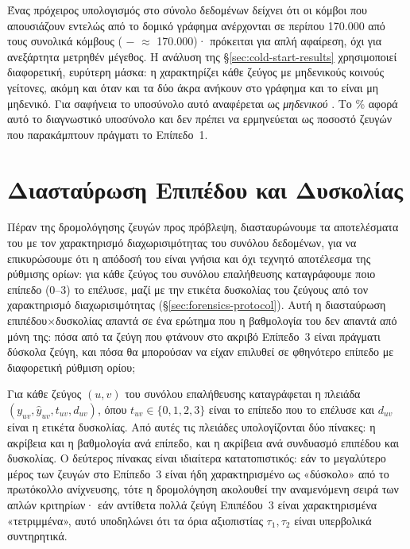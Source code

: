 Ένας πρόχειρος υπολογισμός στο σύνολο δεδομένων  δείχνει ότι οι κόμβοι
που απουσιάζουν εντελώς από το δομικό γράφημα ανέρχονται σε περίπου 170.000 από τους
συνολικά \GraphNodesTotal{} κόμβους (\GraphNodesTotal{} $-$ \GraphNodes{} $\approx$ 170.000)· πρόκειται για απλή
αφαίρεση, όχι για ανεξάρτητα μετρηθέν μέγεθος.
Η ανάλυση της \S\ref{sec:cold-start-results} χρησιμοποιεί διαφορετική, ευρύτερη
μάσκα: η \texttt{} χαρακτηρίζει κάθε ζεύγος με μηδενικούς
κοινούς γείτονες, ακόμη και όταν και τα δύο άκρα ανήκουν στο γράφημα και το
 είναι μη μηδενικό.
Για σαφήνεια το υποσύνολο αυτό
αναφέρεται ως \emph{μηδενικού }.
Το \ColdStartPct\% αφορά αυτό το
διαγνωστικό υποσύνολο και δεν πρέπει να ερμηνεύεται ως ποσοστό ζευγών που
παρακάμπτουν πράγματι το Επίπεδο~1.


\section{Διασταύρωση Επιπέδου και Δυσκολίας}
\label{sec:cascade-diagnostic}

Πέραν της δρομολόγησης ζευγών προς πρόβλεψη, διασταυρώνουμε τα αποτελέσματα του
 με τον χαρακτηρισμό διαχωρισιμότητας του συνόλου δεδομένων, για να
επικυρώσουμε ότι η απόδοσή του είναι γνήσια και όχι τεχνητό αποτέλεσμα της ρύθμισης ορίων: για κάθε
ζεύγος του συνόλου επαλήθευσης καταγράφουμε ποιο επίπεδο (0--3) το επέλυσε, μαζί
με την ετικέτα δυσκολίας του ζεύγους από τον χαρακτηρισμό διαχωρισιμότητας
(\S\ref{sec:forensics-protocol}). Αυτή η διασταύρωση επιπέδου$\times$δυσκολίας
απαντά σε ένα ερώτημα που η βαθμολογία  του  δεν
απαντά από μόνη της: πόσα από τα ζεύγη που φτάνουν στο ακριβό Επίπεδο~3 είναι
πράγματι δύσκολα ζεύγη, και πόσα θα μπορούσαν να είχαν επιλυθεί σε φθηνότερο
επίπεδο με διαφορετική ρύθμιση ορίου;

Για κάθε ζεύγος $(u,v)$ του συνόλου επαλήθευσης καταγράφεται η πλειάδα
$(y_{uv}, \hat{y}_{uv}, t_{uv}, d_{uv})$, όπου $t_{uv} \in \{0,1,2,3\}$ είναι το
επίπεδο που το επέλυσε και $d_{uv}$ είναι η ετικέτα δυσκολίας.
Από αυτές τις
πλειάδες υπολογίζονται δύο πίνακες: η ακρίβεια και η βαθμολογία  ανά
επίπεδο, και η ακρίβεια ανά συνδυασμό επιπέδου και δυσκολίας.
Ο δεύτερος πίνακας
είναι ιδιαίτερα κατατοπιστικός: εάν το μεγαλύτερο μέρος των ζευγών στο Επίπεδο~3
είναι ήδη χαρακτηρισμένο ως «δύσκολο» από το πρωτόκολλο ανίχνευσης, τότε η
δρομολόγηση ακολουθεί την αναμενόμενη σειρά των απλών κριτηρίων· εάν αντίθετα
πολλά ζεύγη Επιπέδου~3
είναι χαρακτηρισμένα «τετριμμένα», αυτό υποδηλώνει ότι τα όρια αξιοπιστίας
$\tau_1, \tau_2$ είναι υπερβολικά συντηρητικά.


